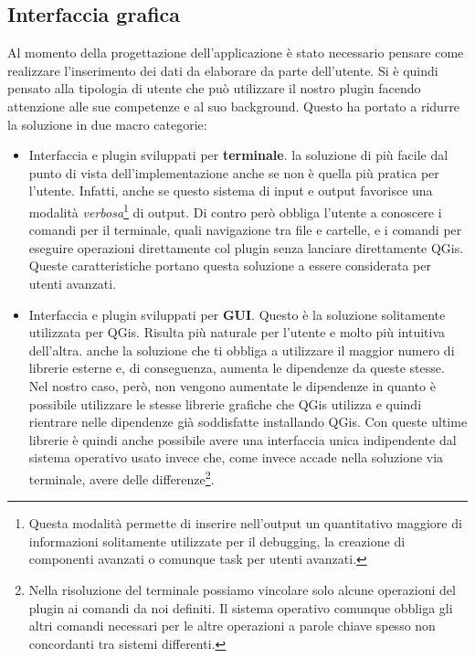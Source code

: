 \subsection{Interfaccia grafica}
Al momento della progettazione dell'applicazione è stato necessario pensare come realizzare l'inserimento dei dati da elaborare da parte dell'utente. 
Si è quindi pensato alla tipologia di utente che può utilizzare il nostro plugin facendo attenzione alle sue competenze e al suo background.
Questo ha portato a ridurre la soluzione in due macro categorie:
\begin{itemize}

\item Interfaccia e plugin sviluppati per \textbf{terminale}. \egrave la soluzione di più facile dal punto di vista dell'implementazione anche se non è quella più pratica per l'utente. Infatti, anche se questo sistema di input e output favorisce una modalità \textit{verbosa}\footnote{Questa modalità permette di inserire nell'output un quantitativo maggiore di informazioni solitamente utilizzate per il debugging, la creazione di componenti avanzati o comunque task per utenti avanzati.} di output. Di contro però obbliga l'utente a conoscere i comandi per il terminale, quali navigazione tra file e cartelle, e i comandi per eseguire operazioni direttamente col plugin senza lanciare direttamente QGis. Queste caratteristiche portano questa soluzione a essere considerata per utenti avanzati.

\item Interfaccia e plugin sviluppati per \textbf{GUI}. Questo è la soluzione solitamente utilizzata per QGis. Risulta più naturale per l'utente e molto più intuitiva dell'altra. \egrave anche la soluzione che ti obbliga a utilizzare il maggior numero di librerie esterne e, di conseguenza, aumenta le dipendenze da queste stesse. Nel nostro caso, però, non vengono aumentate le dipendenze in quanto è possibile utilizzare le stesse librerie grafiche che QGis utilizza e quindi rientrare nelle dipendenze già soddisfatte installando QGis. Con queste ultime librerie è quindi anche possibile avere una interfaccia unica indipendente dal sistema operativo usato invece che, come invece accade nella soluzione via terminale, avere delle differenze\footnote{Nella risoluzione del terminale possiamo vincolare solo alcune operazioni del plugin ai comandi da noi definiti. Il sistema operativo comunque obbliga gli altri comandi necessari per le altre operazioni a parole chiave spesso non concordanti tra sistemi differenti.}.

\end{itemize}

